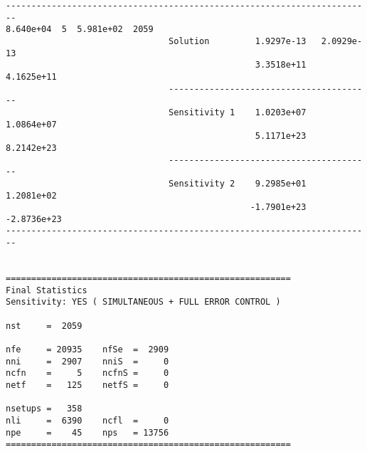 \begin{verbatim}
------------------------------------------------------------------------
8.640e+04  5  5.981e+02  2059
                                Solution         1.9297e-13   2.0929e-13 
                                                 3.3518e+11   4.1625e+11 
                                ----------------------------------------
                                Sensitivity 1    1.0203e+07   1.0864e+07 
                                                 5.1171e+23   8.2142e+23 
                                ----------------------------------------
                                Sensitivity 2    9.2985e+01   1.2081e+02 
                                                -1.7901e+23  -2.8736e+23 
------------------------------------------------------------------------


========================================================
Final Statistics
Sensitivity: YES ( SIMULTANEOUS + FULL ERROR CONTROL )

nst     =  2059                

nfe     = 20935    nfSe  =  2909  
nni     =  2907    nniS  =     0  
ncfn    =     5    ncfnS =     0  
netf    =   125    netfS =     0

nsetups =   358                  
nli     =  6390    ncfl  =     0  
npe     =    45    nps   = 13756  
========================================================
\end{verbatim}